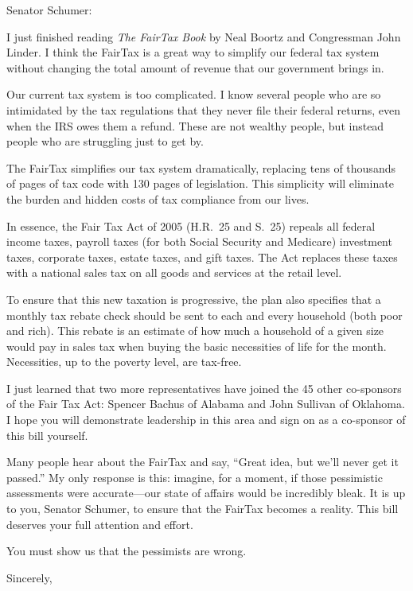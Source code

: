 \documentclass[12pt]{letter}
\begin{document}
\begin{letter}{}

\address{93 Elm St.\\Potsdam, NY 13676}

\signature{Jason Rohrer}

\newcommand{\recipientName}{Senator Schumer}


\opening{\recipientName:}


I just finished reading {\em The FairTax Book} by Neal Boortz and Congressman John Linder.  
I think the FairTax is a great way to simplify our federal tax system without changing the total amount of revenue that our government brings in.


Our current tax system is too complicated.  
I know several people who are so intimidated by the tax regulations that they never file their federal returns, even when the IRS owes them a refund.  
These are not wealthy people, but instead people who are struggling just to get by.  


The FairTax simplifies our tax system dramatically, replacing tens of thousands of pages of tax code with 130 pages of legislation.  
This simplicity will eliminate the burden and hidden costs of tax compliance from our lives.


In essence, the Fair Tax Act of 2005 (H.R.\ 25 and S.\ 25) repeals all federal income taxes, payroll taxes (for both Social Security and Medicare) investment taxes, corporate taxes, estate taxes, and gift taxes.  
The Act replaces these taxes with a national sales tax on all goods and services at the retail level.
  


To ensure that this new taxation is progressive, the plan also specifies that a monthly tax rebate check should be sent to each and every household (both poor and rich).  
This rebate is an estimate of how much a household of a given size would pay in sales tax when buying the basic necessities of life for the month.  
Necessities, up to the poverty level, are tax-free.  


I just learned that two more representatives have joined the 45 other co-sponsors of the Fair Tax Act:  Spencer Bachus of Alabama and John Sullivan of Oklahoma.  
I hope you will demonstrate leadership in this area and sign on as a co-sponsor of this bill yourself.

Many people hear about the FairTax and say, ``Great idea, but we'll never get it passed.''  
My only response is this:  imagine, for a moment, if those pessimistic assessments were accurate---our state of affairs would be incredibly bleak.  
It is up to you, \recipientName, to ensure that the FairTax becomes a reality.
This bill deserves your full attention and effort.  

You must show us that the pessimists are wrong.



\closing{Sincerely,}

\end{letter}
\end{document}
